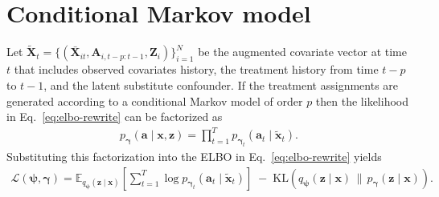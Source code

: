 \section{Conditional Markov model}
Let $\widetilde{\mathbf{X}}_t = \{(\bar{\mathbf{X}}_{it}, \mathbf{A}_{i,t-p:t-1}, 
\mathbf{Z}_i)\}_{i=1}^N$ be the augmented covariate vector at time $t$ 
that includes observed covariates history, the treatment history from time $t-p$ to $t-1$, 
and the latent substitute confounder. If the treatment assignments are 
generated according to a conditional Markov model of order $p$ then the 
likelihood in Eq.~\eqref{eq:elbo-rewrite} can be factorized as 
\begin{align}
p_{\boldsymbol{\gamma}}(\mathbf{a}\mid \mathbf{x},\mathbf{z}) = \prod_{t=1}^T p_{\boldsymbol{\gamma}_t}(\mathbf{a}_{t} \mid \widetilde{\mathbf{x}}_{t}).
\end{align}
Substituting this factorization into the ELBO in Eq.~\eqref{eq:elbo-rewrite} yields
\begin{align}
    \label{eq:sequential_elbo}
\mathcal{L}(\boldsymbol{\psi},\boldsymbol{\gamma})= \mathbb{E}_{q_{\boldsymbol{\psi}}(\mathbf{z}\mid \mathbf{x})}\!\left[\sum_{t=1}^T \log p_{\boldsymbol{\gamma}_t}(\mathbf{a}_{t} \mid \widetilde{\mathbf{x}}_{t})\right]
    \;-\; \mathrm{KL}\!\left(q_{\boldsymbol{\psi}}(\mathbf{z}\mid \mathbf{x})\,\|\,p_{\boldsymbol{\gamma}}(\mathbf{z}\mid \mathbf{x})\right).
\end{align}

